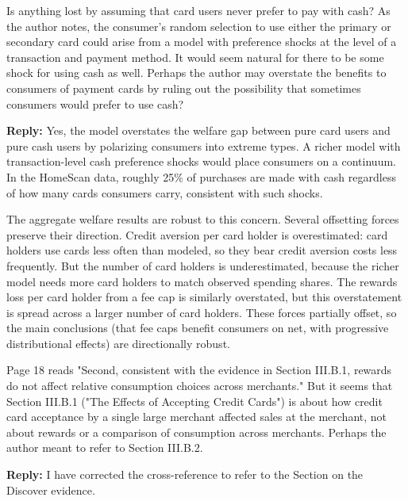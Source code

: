 \documentclass[main.tex]{subfiles}
\begin{document}
\begin{refsection}
\begin{refcommentnoclear}
Is anything lost by assuming that card users never prefer to pay with cash?
As the author notes, the consumer's random selection to use either the primary or secondary card could arise from a model with preference shocks at the level of a transaction and payment method.
It would seem natural for there to be some shock for using cash as well.
Perhaps the author may overstate the benefits to consumers of payment cards by ruling out the possibility that sometimes consumers would prefer to use cash?

\end{refcommentnoclear}

\textbf{Reply:} Yes, the model overstates the welfare gap between pure card users and pure cash users by polarizing consumers into extreme types.
A richer model with transaction-level cash preference shocks would place consumers on a continuum. In the HomeScan data, roughly 25\% of purchases are made with cash regardless of how many cards consumers carry, consistent with such shocks.

The aggregate welfare results are robust to this concern. Several offsetting forces preserve their direction.
Credit aversion per card holder is overestimated: card holders use cards less often than modeled, so they bear credit aversion costs less frequently.
But the number of card holders is underestimated, because the richer model needs more card holders to match observed spending shares.
The rewards loss per card holder from a fee cap is similarly overstated, but this overstatement is spread across a larger number of card holders.
These forces partially offset, so the main conclusions (that fee caps benefit consumers on net, with progressive distributional effects) are directionally robust.

\begin{refcommentnoclear}
Page 18 reads "Second, consistent with the evidence in Section III.B.1, rewards do not affect relative consumption choices across merchants." But it seems that Section III.B.1 ("The Effects of Accepting Credit Cards") is about how credit card acceptance by a single large merchant affected sales at the merchant, not about rewards or a comparison of consumption across merchants.
Perhaps the author meant to refer to Section III.B.2.
\end{refcommentnoclear}

\textbf{Reply:} I have corrected the cross-reference to refer to the Section on the Discover evidence.


\end{refsection}
\end{document}
